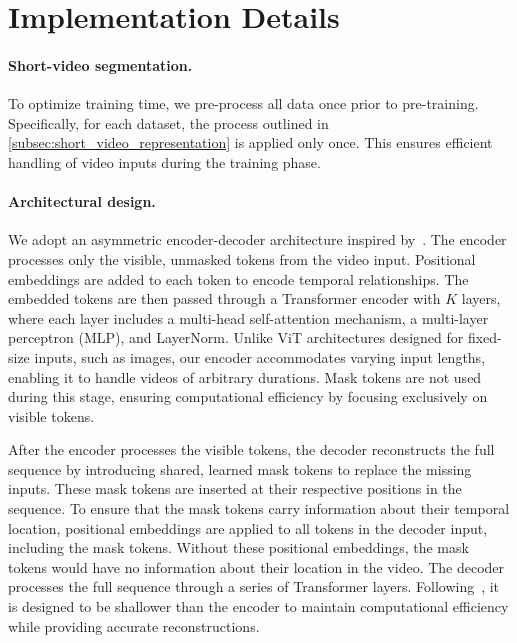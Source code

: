 \clearpage
\setcounter{page}{1}
\maketitlesupplementary

\section{Implementation Details}
\label{app:implementation_details}


\paragraph{Short-video segmentation.} To optimize training time, we pre-process all data once prior to pre-training. Specifically, for each dataset, the process outlined in \cref{subsec:short_video_representation} is applied only once. This ensures efficient handling of video inputs during the training phase.

\paragraph{Architectural design.} 
We adopt an asymmetric encoder-decoder architecture inspired by~\cite{he2022masked}. The encoder processes only the visible, unmasked tokens from the video input. Positional embeddings are added to each token to encode temporal relationships. The embedded tokens are then passed through a Transformer encoder with $K$ layers, where each layer includes a multi-head self-attention mechanism, a multi-layer perceptron (MLP), and LayerNorm. Unlike ViT architectures designed for fixed-size inputs, such as images, our encoder accommodates varying input lengths, enabling it to handle videos of arbitrary durations. Mask tokens are not used during this stage, ensuring computational efficiency by focusing exclusively on visible tokens.

After the encoder processes the visible tokens, the decoder reconstructs the full sequence by introducing shared, learned mask tokens to replace the missing inputs. These mask tokens are inserted at their respective positions in the sequence. To ensure that the mask tokens carry information about their temporal location, positional embeddings are applied to all tokens in the decoder input, including the mask tokens. Without these positional embeddings, the mask tokens would have no information about their location in the video. The decoder processes the full sequence through a series of Transformer layers. Following~\cite{he2022masked}, it is designed to be shallower than the encoder to maintain computational efficiency while providing accurate reconstructions.

